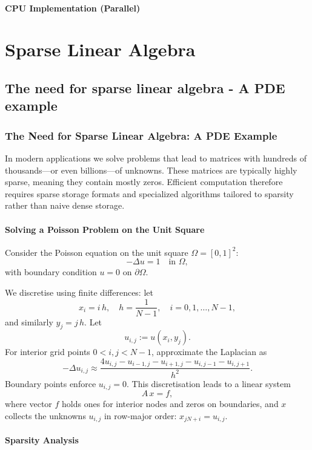 \documentclass[11pt,a4paper]{book}
\begin{document}
\subsection*{CPU Implementation (Parallel)}

\part{Sparse Linear Algebra}

\chapter{The need for sparse linear algebra - A PDE example}

\section{The Need for Sparse Linear Algebra: A PDE Example}

In modern applications we solve problems that lead to matrices with hundreds of thousands—or even billions—of unknowns. These matrices are typically highly sparse, meaning they contain mostly zeros. Efficient computation therefore requires sparse storage formats and specialized algorithms tailored to sparsity rather than naive dense storage.

\subsection*{Solving a Poisson Problem on the Unit Square}

Consider the Poisson equation on the unit square \(\Omega = [0,1]^2\):
\[
 -\Delta u = 1 \quad \text{in } \Omega,
\]
with boundary condition \(u = 0\) on \(\partial\Omega\).

We discretise using finite differences: let
\[
x_i = i\,h,\quad h = \frac{1}{N-1},\quad i = 0,1,\dots,N-1,
\]
and similarly \(y_j = j\,h\). Let
\[
u_{i,j} := u(x_i, y_j).
\]
For interior grid points \(0 < i,j < N-1\), approximate the Laplacian as
\[
-\Delta u_{i,j} \approx \frac{4u_{i,j} - u_{i-1,j} - u_{i+1,j} - u_{i,j-1} - u_{i,j+1}}{h^2}.
\]
Boundary points enforce \(u_{i,j} = 0\). This discretisation leads to a linear system
\[
A\,x = f,
\]
where vector \(f\) holds ones for interior nodes and zeros on boundaries, and \(x\) collects the unknowns \(u_{i,j}\) in row-major order: \(x_{jN + i} = u_{i,j}\).

\subsection*{Sparsity Analysis}
\end{document}
